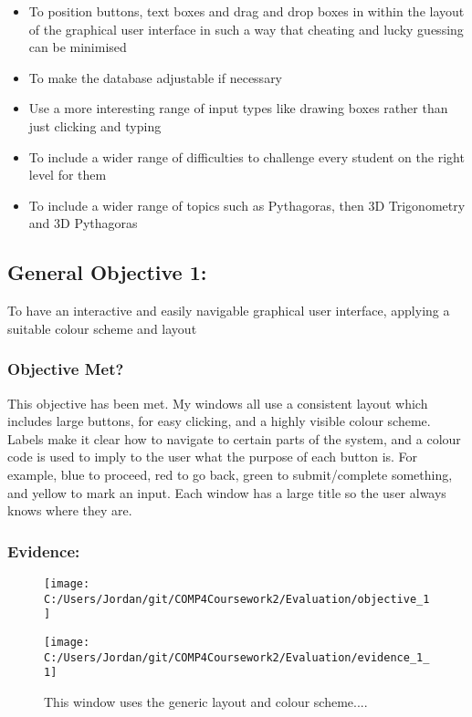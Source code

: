 \begin{itemize}
	\item To position buttons, text boxes and drag and drop boxes in within the layout of the graphical user interface in such a way that cheating and lucky guessing can be minimised
	\item To make the database adjustable if necessary
	\item Use a more interesting range of input types like drawing boxes rather than just clicking and typing
	\item To include a wider range of difficulties to challenge every student on the right level for them
	\item To include a wider range of topics such as Pythagoras, then 3D Trigonometry and 3D Pythagoras
\end{itemize}

\subsection{General Objective 1: }

To have an interactive and easily navigable graphical user interface, applying a suitable colour scheme and layout

\subsubsection{Objective Met?}

This objective has been met. My windows all use a consistent layout which includes large buttons, for easy clicking, and a highly visible colour scheme. Labels make it clear how to navigate to certain parts of the system, and a colour code is used to imply to the user what the purpose of each button is. For example, blue to proceed, red to go back, green to submit/complete something, and yellow to mark an input. Each window has a large title so the user always knows where they are.

\subsubsection{Evidence: }

\begin{figure}[H]
	\texttt{[image: C:/Users/Jordan/git/COMP4Coursework2/Evaluation/objective\_1]}
\end{figure}

\begin{figure}[H]
	\texttt{[image: C:/Users/Jordan/git/COMP4Coursework2/Evaluation/evidence\_1\_1]}
	\caption{This window uses the generic layout and colour scheme....}
\end{figure}

